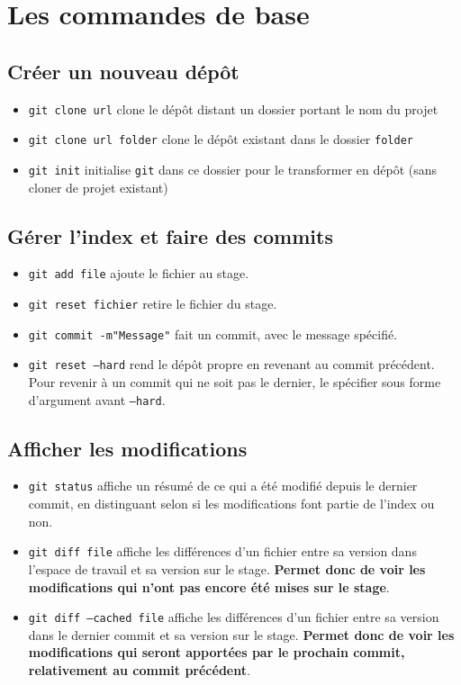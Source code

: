 \documentclass[french]{report}
\newcommand\itemb{\item[$\bullet$]}
\begin{document}
\section{Les commandes de base}

\subsection{Créer un nouveau dépôt}

\begin{itemize}
   \itemb \texttt{git clone url} clone le dépôt distant un dossier portant le nom du projet
    \itemb \texttt{git clone url folder} clone le dépôt existant dans le dossier \texttt{folder}
    \itemb \texttt{git init} initialise \texttt{git} dans ce dossier pour le transformer en dépôt (sans cloner de projet existant)
\end{itemize}

\subsection{Gérer l'index et faire des commits}

\begin{itemize}
    \itemb \texttt{git add file} ajoute le fichier au stage.
    \itemb \texttt{git reset fichier} retire le fichier du stage.
    \itemb \texttt{git commit -m"Message"} fait un commit, avec le message spécifié.
    \itemb \texttt{git reset ---hard} rend le dépôt propre en revenant au commit précédent.
    Pour revenir à un commit qui ne soit pas le dernier, le spécifier sous forme d'argument avant \texttt{---hard}.
\end{itemize}

\subsection{Afficher les modifications}

\begin{itemize}
    \itemb \texttt{git status} affiche un résumé de ce qui a été modifié depuis le dernier commit, en distinguant selon si les modifications font partie de l'index ou non.
    \itemb \texttt{git diff file} affiche les différences d'un fichier entre sa version dans l'espace de travail et sa version sur le stage.
    \textbf{Permet donc de voir les modifications qui n'ont pas encore été mises sur le stage}.
    \itemb \texttt{git diff ---cached file} affiche les différences d'un fichier entre sa version dans le dernier commit et sa version sur le stage.
    \textbf{Permet donc de voir les modifications qui seront apportées par le prochain commit, relativement au commit précédent}.
\end{itemize}
\end{document}
